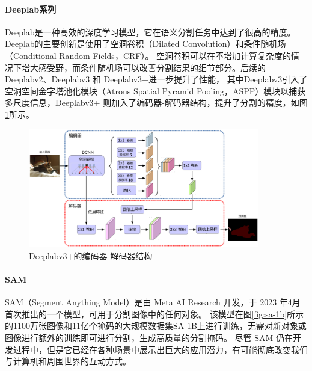 \paragraph{Deeplab系列}
\par Deeplab\cite{deeplab}是一种高效的深度学习模型，它在语义分割任务中达到了很高的精度。Deeplab的主要创新是使用了空洞卷积（Dilated
Convolution）和条件随机场（Conditional Random Fields，CRF）。
空洞卷积可以在不增加计算复杂度的情况下增大感受野，而条件随机场可以改善分割结果的细节部分。后续的Deeplabv2\cite{deeplab2}、Deeplabv3
和 Deeplabv3+\cite{deeplab3plus}进一步提升了性能， 其中Deeplabv3引入了空洞空间金字塔池化模块（Atrous
Spatial Pyramid Pooling，ASPP）模块以捕获多尺度信息，Deeplabv3+
则加入了编码器-解码器结构，提升了分割的精度，如图\ref{fig:Deeplabv3+}\cite{deeplab3plus}所示。

\begin{figure}[htb]
	\centering
	\includegraphics[width=0.9\textwidth]{figures/deeplab3_endecoder.png}
	\caption{Deeplabv3+的编码器-解码器结构}
	\label{fig:Deeplabv3+}
\end{figure}

\paragraph{SAM}
\par SAM（Segment Anything Model）\cite{segment_anything}是由 Meta AI Research 开发，于 2023
年4月首次推出的一个模型，可用于分割图像中的任何对象。
该模型在图\ref{fig:sa-1b}\cite{segment_anything}所示的1100万张图像和11亿个掩码的大规模数据集SA-1B上进行训练，无需对新对象或图像进行额外的训练即可进行分割，生成高质量的分割掩码。
尽管 SAM 仍在开发过程中，但是它已经在各种场景中展示出巨大的应用潜力，有可能彻底改变我们与计算机和周围世界的互动方式。

